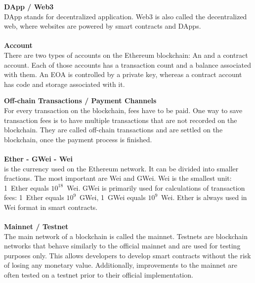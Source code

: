 \textbf{DApp / Web3}\\
DApp stands for decentralized application.
Web3 is also called the decentralized web, where websites are powered by smart contracts and DApps.
\\\\

\textbf{Account}\\
There are two types of accounts on the Ethereum blockchain: An  and a contract account.
Each of those accounts has a transaction count and a balance\cite{ethereum-yellow-paper} associated with them.
An EOA is controlled by a private key, whereas a contract account has code and storage associated with it.
\newpage

\textbf{Off-chain Transactions / Payment Channels}\\
For every transaction on the blockchain, fees have to be paid.
One way to save transaction fees is to have multiple transactions that are not recorded on the blockchain.
They are called off-chain transactions and are settled on the blockchain, once the payment process is finished.
\\\\

\textbf{Ether - GWei - Wei}\\
 is the currency used on the Ethereum network.
It can be divided into smaller fractions.
The most important are Wei and GWei.
Wei is the smallest unit: 1~Ether equals \(10^{18}\)~Wei\cite{ethereum-yellow-paper}.
GWei is primarily used for calculations of transaction fees: 1~Ether equals \(10^{9}\)~GWei, 1~GWei equals \(10^{9}\)~Wei.
Ether is always used in Wei format in smart contracts.
\\\\

\textbf{Mainnet / Testnet}\\
The main network of a blockchain is called the mainnet.
Testnets are blockchain networks that behave similarly to the official mainnet and are used for testing purposes only.
This allows developers to develop smart contracts without the risk of losing any monetary value.
Additionally, improvements to the mainnet are often tested on a testnet prior to their official implementation.